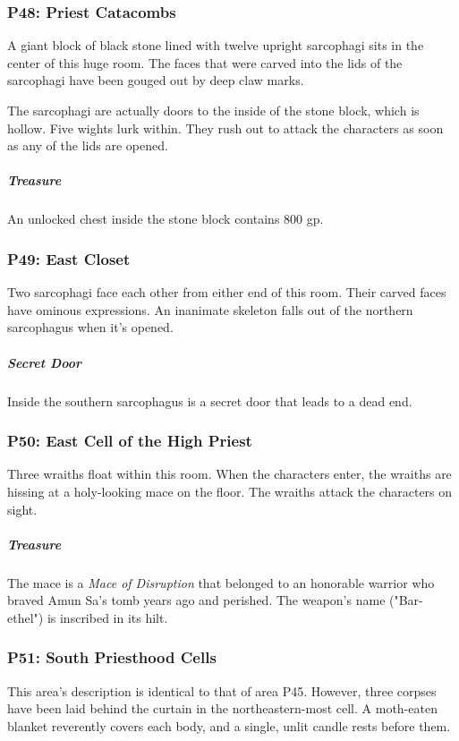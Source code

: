 \documentclass[10pt,a4paper,twoside,bg=print,twocolumn,openany,nodeprecatedcode]{dndbook}
\begin{document}
\subsubsection{P48: Priest Catacombs}
\begin{DndReadAloud}{}
A giant block of black stone lined with twelve upright sarcophagi sits in the center of this huge room. The faces that were carved into the lids of the sarcophagi have been gouged out by deep claw marks.

\end{DndReadAloud}

The sarcophagi are actually doors to the inside of the stone block, which is hollow. Five wights lurk within. They rush out to attack the characters as soon as any of the lids are opened.

\subparagraph{Treasure}
An unlocked chest inside the stone block contains 800 gp.

\subsubsection{P49: East Closet}
Two sarcophagi face each other from either end of this room. Their carved faces have ominous expressions. An inanimate skeleton falls out of the northern sarcophagus when it's opened.

\subparagraph{Secret Door}
Inside the southern sarcophagus is a secret door that leads to a dead end.

\subsubsection{P50: East Cell of the High Priest}
Three wraiths float within this room. When the characters enter, the wraiths are hissing at a holy-looking mace on the floor. The wraiths attack the characters on sight.

\subparagraph{Treasure}
The mace is a \textit{Mace of Disruption} that belonged to an honorable warrior who braved Amun Sa's tomb years ago and perished. The weapon's name ("Bar-ethel") is inscribed in its hilt.

\subsubsection{P51: South Priesthood Cells}
This area's description is identical to that of area P45. However, three corpses have been laid behind the curtain in the northeastern-most cell. A moth-eaten blanket reverently covers each body, and a single, unlit candle rests before them.
\end{document}
